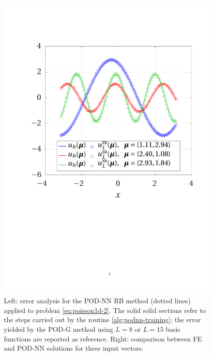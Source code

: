 \documentclass[12pt, a4paper, twoside, openright, notitlepage]{report}
\numberwithin{equation}{chapter}
\theoremstyle{theorem}
\theoremstyle{definition}
\theoremstyle{remark}
\theoremstyle{proposition}
\numberwithin{figure}{chapter}
\begin{document}
\begin{figure}[t!]
			\includegraphics[scale = 0.42, trim = {1cm 9cm 1.5cm 3.5cm}, clip]{poisson1d_2_fe_vs_podnn}
			
			\caption{Left: error analysis for the POD-NN RB method (dotted lines) applied to problem \eqref{eq:poisson1d-2}. The solid solid sections refer to the steps carried out by the routine \ref{alg:podnn-training}; the error yielded by the POD-G method using $L = 8$ or $L = 15$ basis functions are reported as reference. Right: comparison between FE and POD-NN solutions for three input vectors.}
			\label{fig:poisson1d-2-fig2}
		\end{figure}
		
\end{document}
